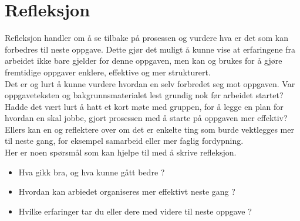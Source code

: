 \documentclass[../main-no.tex]{subfiles}
\begin{document}
\renewcommand{\baselinestretch}{1.5}
\section{Refleksjon}
Refleksjon handler om å se tilbake på prosessen og vurdere hva er det som kan forbedres til neste oppgave. Dette gjør det muligt å kunne vise at erfaringene fra arbeidet ikke bare gjelder for denne oppgaven, men kan og brukes for å gjøre fremtidige oppgaver enklere, effektive og mer strukturert. \\

Det er og lurt å kunne vurdere hvordan en selv forbredet seg mot oppgaven. Var oppgaveteksten og bakgrunnsmaterialet lest grundig nok før arbeidet startet? Hadde det vært lurt å hatt et kort møte med gruppen, for å legge en plan for hvordan en skal jobbe, gjort prosessen med å starte på oppgaven mer effektiv? Ellers kan en og reflektere over om det er enkelte ting som burde vektlegges mer til neste gang, for eksempel samarbeid eller mer faglig fordypning. \\

Her er noen spørsmål som kan hjelpe til med å skrive refleksjon.

\begin{itemize}
    \item Hva gikk bra, og hva kunne gått bedre ?
    \item Hvordan kan arbiedet organiseres mer effektivt neste gang ?
    \item Hvilke erfaringer tar du eller dere med videre til neste oppgave ?
\end{itemize}
\end{document}
